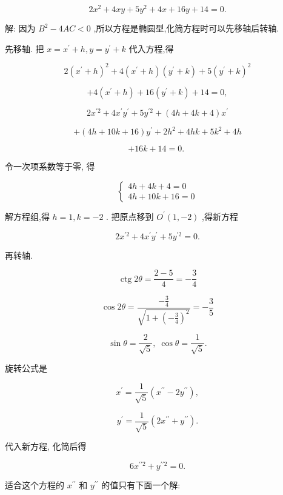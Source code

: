 \documentclass[lang=cn,newtx,10pt,scheme=chinese]{elegantbook}
\begin{document}
\[
  2{x}^{2} + {4xy} + 5{y}^{2} + {4x} + {16y} + {14} = 0.
\]

解: 因为 \({B}^{2} - {4AC} < 0\) ,所以方程是椭圆型,化简方程时可以先移轴后转轴.

先移轴. 把 \(x = {x}^{\prime } + h,y = {y}^{\prime } + k\) 代入方程,得

\[
  2{\left( {x}^{\prime } + h\right) }^{2} + 4\left( {{x}^{\prime } + h}\right) \left( {{y}^{\prime } + k}\right) + 5{\left( {y}^{\prime } + k\right) }^{2}
\]

\[
  + 4\left( {{x}^{\prime } + h}\right) + {16}\left( {{y}^{\prime } + k}\right) + {14} = 0,
\]

\[
  2{x}^{\prime 2} + 4{x}^{\prime }{y}^{\prime } + 5{y}^{\prime 2} + \left( {{4h} + {4k} + 4}\right) {x}^{\prime }
\]

\[
  + \left( {{4h} + {10k} + {16}}\right) {y}^{\prime } + 2{h}^{2} + {4hk} + 5{k}^{2} + {4h}
\]

\[
  + {16k} + {14} = 0\text{. }
\]

令一次项系数等于零, 得

\[
  \left\{ \begin{array}{l} {4h} + {4k} + 4 = 0 \\ {4h} + {10k} + {16} = 0 \end{array}\right.
\]

解方程组,得 \(h = 1,k = - 2\) . 把原点移到 \({O}^{\prime }\left( {1, - 2}\right)\) ,得新方程

\[
  2{x}^{\prime 2} + 4{x}^{\prime }{y}^{\prime } + 5{y}^{\prime 2} = 0.
\]

再转轴.

\[
  \operatorname{ctg}{2\theta } = \frac{2 - 5}{4} = - \frac{3}{4}
\]

\[
  \cos {2\theta } = \frac{-\frac{3}{4}}{\sqrt{1 + {\left( -\frac{3}{4}\right) }^{2}}} = - \frac{3}{5}
\]

\[
  \sin \theta = \frac{2}{\sqrt{5}},\;\cos \theta = \frac{1}{\sqrt{5}}.
\]

旋转公式是

\[
    {x}^{\prime } = \frac{1}{\sqrt{5}}\left( {{x}^{\prime \prime } - 2{y}^{\prime \prime }}\right) ,
\]

\[
    {y}^{\prime } = \frac{1}{\sqrt{5}}\left( {2{x}^{\prime \prime } + {y}^{\prime \prime }}\right) .
\]

代入新方程, 化简后得

\[
  6{x}^{\prime \prime 2} + {y}^{\prime \prime 2} = 0.
\]

适合这个方程的 \({x}^{\prime \prime }\) 和 \({y}^{\prime \prime }\) 的值只有下面一个解:
\end{document}
